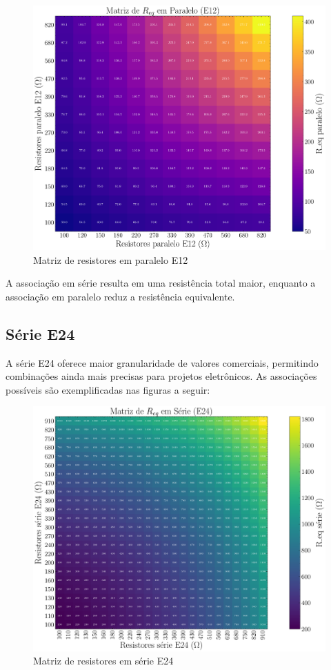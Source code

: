 \documentclass[conference]{IEEEtran}
\begin{document}
\begin{figure}[htbp]
    \centering
    \caption{Matriz de resistores em paralelo E12}
    \label{fig:matriz_paralelo_e12}
    \includegraphics[width=0.8\linewidth]{figures/matriz_paralelo_e12.pdf}
\end{figure}

A associação em série resulta em uma resistência total maior, enquanto a associação em paralelo reduz a resistência equivalente.

\subsection{Série E24}%

A série E24 oferece maior granularidade de valores comerciais, permitindo combinações ainda mais precisas para projetos eletrônicos. As associações possíveis são exemplificadas nas figuras a seguir:
\begin{figure}[htbp]
    \centering
    \caption{Matriz de resistores em série E24}
    \label{fig:matriz_serie_e24}
    \includegraphics[width=0.8\linewidth]{figures/matriz_serie_e24.pdf}
\end{figure}
\end{document}

